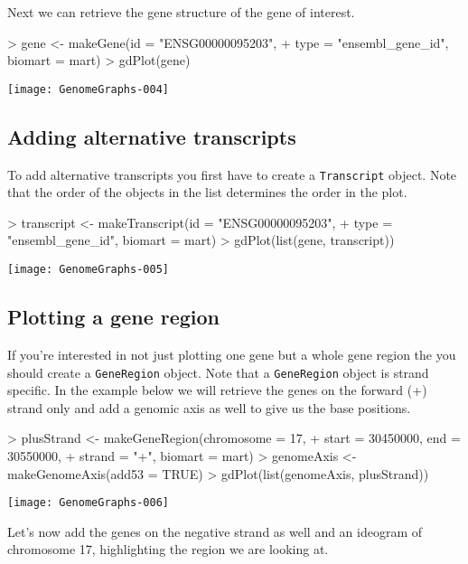 \documentclass[11pt]{article}
\newcommand{\Robject}[1]{{\texttt{#1}}}
\begin{document}
Next we can retrieve the gene structure of the gene of interest.

\begin{Schunk}
\begin{Sinput}
> gene <- makeGene(id = "ENSG00000095203", 
+     type = "ensembl_gene_id", biomart = mart)
> gdPlot(gene)
\end{Sinput}
\end{Schunk}
\texttt{[image: GenomeGraphs-004]}

\subsection{Adding alternative transcripts}

To add alternative transcripts you first have to create a \Robject{Transcript} object.
Note that the order of the objects in the list determines the order in the plot.
\begin{Schunk}
\begin{Sinput}
> transcript <- makeTranscript(id = "ENSG00000095203", 
+     type = "ensembl_gene_id", biomart = mart)
> gdPlot(list(gene, transcript))
\end{Sinput}
\end{Schunk}
\texttt{[image: GenomeGraphs-005]}

\subsection{Plotting a gene region}

If you're interested in not just plotting one gene but a whole gene
region the you should create a \Robject{GeneRegion} object.  Note that
a \Robject{GeneRegion} object is strand specific.  In the example
below we will retrieve the genes on the forward (+) strand only and
add a genomic axis as well to give us the base positions.

\begin{Schunk}
\begin{Sinput}
> plusStrand <- makeGeneRegion(chromosome = 17, 
+     start = 30450000, end = 30550000, 
+     strand = "+", biomart = mart)
> genomeAxis <- makeGenomeAxis(add53 = TRUE)
> gdPlot(list(genomeAxis, plusStrand))
\end{Sinput}
\end{Schunk}
\texttt{[image: GenomeGraphs-006]}

Let's now add the genes on the negative strand as well and an ideogram
of chromosome 17, highlighting the region we are looking at.
\end{document}
